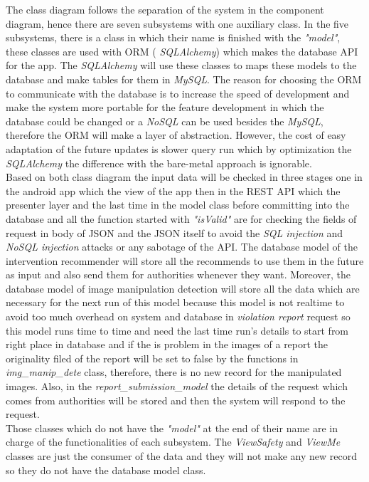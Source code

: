 The class diagram follows the separation of the system in the component diagram, hence there are seven subsystems with one auxiliary class. In the five subsystems, there is a class in which their name is finished with the  \emph{"model"}, these classes are used with ORM ( \emph{SQLAlchemy}) which makes the database API for the app. The  \emph{SQLAlchemy} will use these classes to maps these models to the database and make tables for them in  \emph{MySQL}. The reason for choosing the ORM to communicate with the database is to increase the speed of development and make the system more portable for the feature development in which the database could be changed or a  \emph{NoSQL} can be used besides the  \emph{MySQL}, therefore the ORM will make a layer of abstraction. However, the cost of easy adaptation of the future updates is slower query run which by optimization the  \emph{SQLAlchemy} the difference with the bare-metal approach is ignorable.\\
Based on both class diagram the input data will be checked in three stages one in the android app which the view of the app then in the REST API which the presenter layer and the last time in the model class before committing into the database and all the function started with  \emph{"isValid"} are for checking the fields of request in body of JSON and the JSON itself to avoid the  \emph{SQL injection} and  \emph{NoSQL injection} attacks or any sabotage of the API. The database model of the intervention recommender will store all the recommends to use them in the future as input and also send them for authorities whenever they want. Moreover, the database model of image manipulation detection will store all the data which are necessary for the next run of this model because this model is not realtime to avoid too much overhead on system and database in  \emph{violation report} request so this model runs time to time and need the last time run's details to start from right place in database and if the is problem in the images of a report the originality filed of the report will be set to false by the functions in  \emph{img\_manip\_dete} class, therefore, there is no new record for the manipulated images. Also, in the  \emph{report\_submission\_model} the details of the request which comes from authorities will be stored and then the system will respond to the request.\\
Those classes which do not have the  \emph{"model"} at the end of their name are in charge of the functionalities of each subsystem. The  \emph{ViewSafety} and  \emph{ViewMe} classes are just the consumer of the data and they will not make any new record so they do not have the database model class.\\
